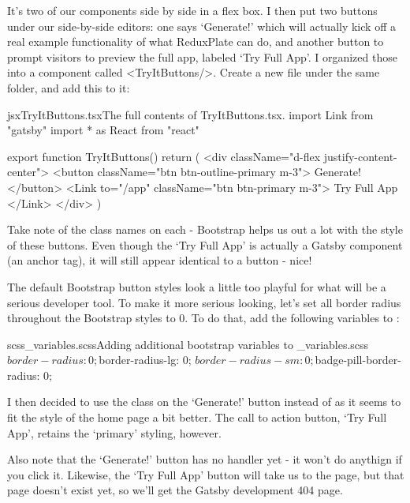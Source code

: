 \documentclass[paper=6in:9in,pagesize=pdftex,headinclude=on,footinclude=on,12pt]{scrbook}
\begin{document}
It's two of our  components side by side in a flex box. I then put two buttons under our side-by-side editors: one says `Generate!' which will actually kick off a real example functionality of what ReduxPlate can do, and another button to prompt visitors to preview the full app, labeled `Try Full App'. I organized those into a component called <TryItButtons/>. Create a new file  under the same  folder, and add this to it:

\begin{codeInput}{jsx}{TryItButtons.tsx}{The full contents of TryItButtons.tsx.}
import { Link } from "gatsby"
import * as React from "react"

export function TryItButtons() {
  return (
    <div className="d-flex justify-content-center">
      <button className="btn btn-outline-primary m-3">
        Generate!
      </button>
      <Link to="/app" className="btn btn-primary m-3">
        Try Full App
      </Link>
    </div>
  )
}  
\end{codeInput}

Take note of the class names on each - Bootstrap helps us out a lot with the style of these buttons. Even though the `Try Full App' is actually a Gatsby  component (an anchor tag), it will still appear identical to a button - nice! 


The default Bootstrap button styles look a little too playful for what will be a serious developer tool. To make it more serious looking, let's set all border radius throughout the Bootstrap styles to 0. To do that, add the following variables to :

\begin{codeInput}{scss}{\_variables.scss}{Adding additional bootstrap variables to \_variables.scss}
$border-radius: 0;
$border-radius-lg: 0;
$border-radius-sm: 0;
$badge-pill-border-radius: 0;
\end{codeInput}

I then decided to use the class  on the `Generate!' button instead of  as it seems to fit the style of the home page a bit better. The call to action button, `Try Full App', retains the `primary' styling, however. 

Also note that the `Generate!' button has no  handler yet - it won't do anythign if you click it. Likewise, the `Try Full App' button will take us to the  page, but that page doesn't exist yet, so we'll get the Gatsby development 404 page.
\end{document}
